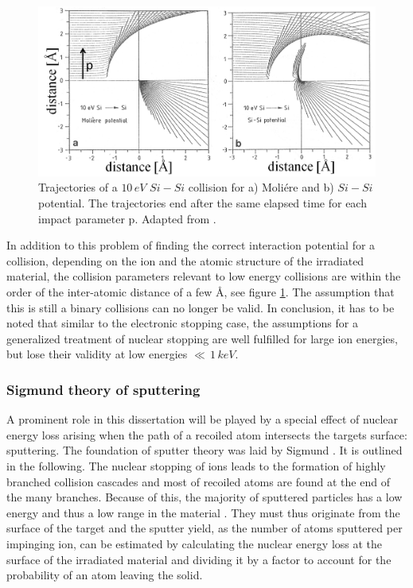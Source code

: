\begin{figure}
	\centering
		\includegraphics[width=.6\textwidth]{images/SiSicollision.jpg}
	\caption{Trajectories of a $10\,eV$ $Si-Si$ collision for a) Moliére and b) $Si-Si$ potential. The trajectories end after the same elapsed time for each impact parameter p. Adapted from \cite{eckstein_computer_1991}.}
	\label{SiSi}
\end{figure} 

In addition to this problem of finding the correct interaction potential for a collision, depending on the ion and the atomic structure of the irradiated material, the collision parameters relevant to low energy collisions are within the order of the inter-atomic distance of a few \AA, see figure \ref{SiSi}. The assumption that this is still a binary collisions can no longer be valid. In conclusion, it has to be noted that similar to the electronic stopping case, the assumptions for a generalized treatment of nuclear stopping are well fulfilled for large ion energies, but lose their validity at low energies $\ll\,1\,keV$.

\subsubsection{Sigmund theory of sputtering}

A prominent role in this dissertation will be played by a special effect of nuclear energy loss arising when the path of a recoiled atom intersects the targets surface: sputtering. The foundation of sputter theory was laid by Sigmund \cite{sigmund_theory_1969}. It is outlined in the following. The nuclear stopping of ions leads to the formation of highly branched collision cascades and most of recoiled atoms are found at the end of the many branches. Because of this, the majority of sputtered particles has a low energy and thus a low range in the material \cite{thompson_energy_1968}. They must thus originate from the surface of the target and the sputter yield, as the number of atoms sputtered per impinging ion, can be estimated by calculating the nuclear energy loss at the surface of the irradiated material and dividing it by a factor to account for the probability of an atom leaving the solid. 

